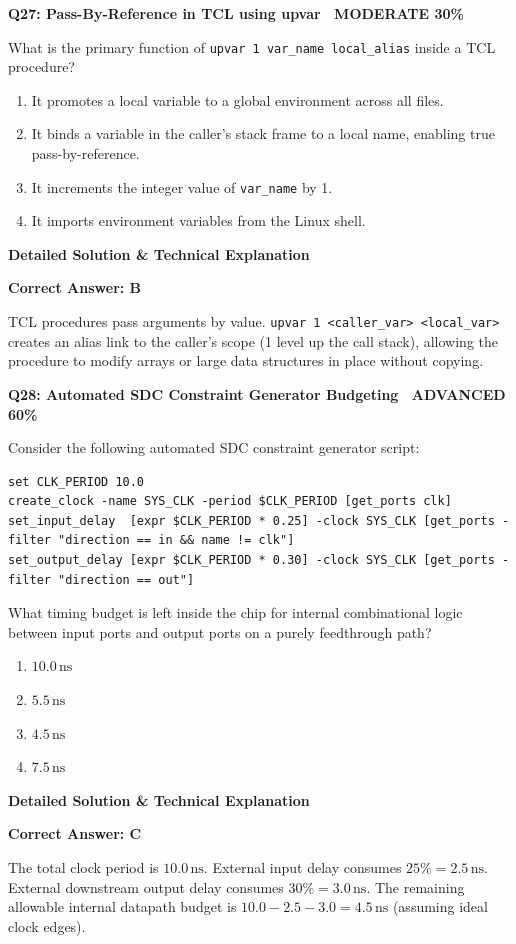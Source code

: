 \documentclass[11pt,a4paper]{article}
\newcommand{\badgeadv}{{\color{white}\colorbox{advred}{\bfseries\sffamily\tiny\ ADVANCED 60\%\ }}}
\newcommand{\badgemod}{{\color{white}\colorbox{modoran}{\bfseries\sffamily\tiny\ MODERATE 30\%\ }}}
\newenvironment{qbox}[2]{%
  \begin{mdframed}[style=qstyle]%
  {\bfseries\sffamily\color{primaryblue}#1 \hfill #2}\par\vspace{2pt}%
}{%
  \end{mdframed}%
}
\newenvironment{ansbox}{%
  \begin{mdframed}[style=ansstyle]%
  {\bfseries\sffamily\color{ansgreen}\small Detailed Solution \& Technical Explanation}\par\vspace{2pt}\small%
}{%
  \end{mdframed}%
}
\begin{document}
\begin{qbox}{Q27: Pass-By-Reference in TCL using upvar}{\badgemod}
What is the primary function of \texttt{upvar 1 var\_name local\_alias} inside a TCL procedure?
\begin{enumerate}[label=\textbf{\Alph*.}]
  \item It promotes a local variable to a global environment across all files.
  \item It binds a variable in the caller's stack frame to a local name, enabling true pass-by-reference.
  \item It increments the integer value of \texttt{var\_name} by 1.
  \item It imports environment variables from the Linux shell.
\end{enumerate}
\end{qbox}
\begin{ansbox}
\textbf{Correct Answer: B}

TCL procedures pass arguments by value. \texttt{upvar 1 <caller\_var> <local\_var>} creates an alias link to the caller's scope (1 level up the call stack), allowing the procedure to modify arrays or large data structures in place without copying.
\end{ansbox}

\begin{qbox}{Q28: Automated SDC Constraint Generator Budgeting}{\badgeadv}
Consider the following automated SDC constraint generator script:
\begin{lstlisting}[style=tclstyle]
set CLK_PERIOD 10.0
create_clock -name SYS_CLK -period $CLK_PERIOD [get_ports clk]
set_input_delay  [expr $CLK_PERIOD * 0.25] -clock SYS_CLK [get_ports -filter "direction == in && name != clk"]
set_output_delay [expr $CLK_PERIOD * 0.30] -clock SYS_CLK [get_ports -filter "direction == out"]
\end{lstlisting}
What timing budget is left inside the chip for internal combinational logic between input ports and output ports on a purely feedthrough path?
\begin{enumerate}[label=\textbf{\Alph*.}]
  \item $10.0\,\text{ns}$
  \item $5.5\,\text{ns}$
  \item $4.5\,\text{ns}$
  \item $7.5\,\text{ns}$
\end{enumerate}
\end{qbox}
\begin{ansbox}
\textbf{Correct Answer: C}

The total clock period is $10.0\,\text{ns}$. External input delay consumes $25\% = 2.5\,\text{ns}$. External downstream output delay consumes $30\% = 3.0\,\text{ns}$. The remaining allowable internal datapath budget is $10.0 - 2.5 - 3.0 = 4.5\,\text{ns}$ (assuming ideal clock edges).
\end{ansbox}
\end{document}
